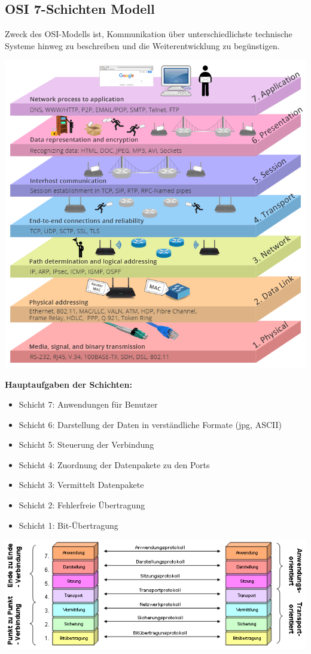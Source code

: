 \documentclass[12pt,a4paper]{article}
\begin{document}
\subsection{OSI 7-Schichten Modell}
Zweck des OSI-Modells ist, Kommunikation über unterschiedlichste technische Systeme hinweg zu beschreiben und die Weiterentwicklung zu begünstigen.\newline\newline
	\begin{minipage}{.5\textwidth}
		\includegraphics[scale=.45]{Bilder/OSI-Modell1}
	\end{minipage}
	\begin{minipage}{.5\textwidth}
		\textbf{Hauptaufgaben der Schichten:}
			\begin{itemize}
				\item Schicht 7: Anwendungen für Benutzer
				\item Schicht 6: Darstellung der Daten in verständliche Formate (jpg, ASCII)
				\item Schicht 5: Steuerung der Verbindung
				\item Schicht 4: Zuordnung der Datenpakete zu den Ports
				\item Schicht 3: Vermittelt Datenpakete
				\item Schicht 2: Fehlerfreie Übertragung
				\item Schicht 1: Bit-Übertragung 
			\end{itemize}
	\end{minipage}
\includegraphics[scale=.75]{Bilder/OSI-Modell2}
\end{document}
